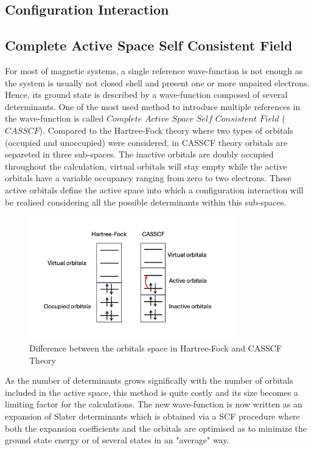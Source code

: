 \documentclass[10pt]{report}
\numberwithin{equation}{section}
\begin{document}
\subsection{Configuration Interaction}




\subsection{Complete Active Space Self Consistent Field}

For most of magnetic systems, a single reference wave-function is not enough as the system is usually not closed shell and present one or more unpaired electrons.
Hence, its ground state is described by a wave-function composed of several determinants.
One of the most used method to introduce multiple references in the wave-function is called $Complete$ $Active$ $Space$ $Self$ $Consistent$ $Field$ ($CASSCF$). 
Compared to the Hartree-Fock theory where two types of orbitals (occupied and unoccupied) were considered, in CASSCF theory orbitals are separeted in three sub-spaces. The inactive orbitals are doubly occupied throughout the calculation, virtual orbitals will stay empty while the active orbitals have a variable occupancy ranging from zero to two electrons.
These active orbitals define the active space into which a configuration interaction will be realised considering all the possible determinants within this sub-spaces. 
\begin{figure}
    \centering
    \includegraphics[width=0.8\textwidth]{Images/EspaceCAS.png}
    \caption{Difference between the orbitals space in Hartree-Fock and CASSCF Theory}
    \label{CAS}
\end{figure}
As the number of determinants grows significally with the number of orbitals included in the active space, this method is quite costly and its size becomes a limiting factor for the calculations.
The new wave-function is now written as an expansion of Slater determinants which is obtained via a SCF procedure where both the expansion coefficients and the orbitals are optimised as to minimize the ground state energy or of several states in an "average" way. 
\end{document}
